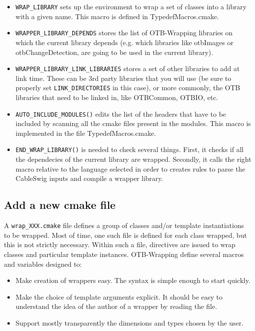 \begin{itemize}
\item	\verb$WRAP_LIBRARY$  sets up the environment to wrap a set of classes into a 
library with a given name. This macro is defined in TypedefMacros.cmake. 

\item	\verb$WRAPPER_LIBRARY_DEPENDS$ stores the list of OTB-Wrapping libraries on which the current library depends 
(e.g. which libraries like otbImages or otbChangeDetection, are going to be used in the current library). 

\item	\verb$WRAPPER_LIBRARY_LINK_LIBRARIES$ stores a set of other libraries to add at link time. 
These can be 3rd party libraries that you will use 
(be sure to properly set \verb$LINK_DIRECTORIES$ in this case), 
or more commonly, the OTB libraries that need to 
be linked in, like OTBCommon, OTBIO, etc.

\item	\verb$AUTO_INCLUDE_MODULES()$  edits the list of the headers that have to 
be included by scanning all the cmake files present in the modules. This macro is implemented in the 
file TypedefMacros.cmake.

\item \verb$END_WRAP_LIBRARY()$ is needed to check several things. First, it checks if all the dependecies 
of the current library are wrapped. Secondly, it calls the right macro relative to the language selected in 
order to creates rules to parse the CableSwig inputs and compile a wrapper library. 
\end{itemize}

\subsection{Add a new cmake file}
A \verb$wrap_XXX.cmake$ file defines a group of classes and/or template instantiations to be wrapped. 
Most of time, one such file is defined for each class wrapped, but this is not strictly necessary. 
Within such a file, directives are issued to wrap classes and particular template instances.
OTB-Wrapping define several macros and variables designed to:

\begin{itemize}
\item Make creation of wrappers easy. The syntax is simple enough to start quickly.
\item Make the choice of template arguments explicit. It should be easy 
  to understand the idea of the author of a wrapper by reading the file. 
\item Support mostly transparently the dimensions and types chosen by the user.
\end{itemize}

